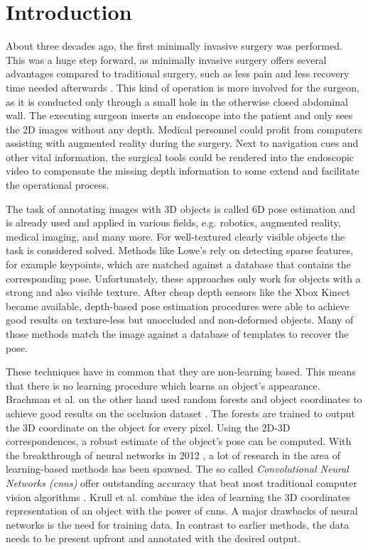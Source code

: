 \chapter{Introduction}

About three decades ago, the first minimally invasive surgery was performed. This was a huge step forward, as minimally invasive surgery offers several advantages compared to traditional surgery, such as less pain and less recovery time needed afterwards \cite{minimallyinvasive}. This kind of operation is more involved for the surgeon, as it is conducted only through a small hole in the otherwise closed abdominal wall. The executing surgeon inserts an endoscope into the patient and only sees the 2D images without any depth. Medical personnel could profit from computers assisting with augmented reality during the surgery. Next to navigation cues and other vital information, the surgical tools could be rendered into the  endoscopic video to compensate the missing depth information to some extend and facilitate the operational process. \

The task of annotating images with 3D objects is called 6D pose estimation and is already used and applied in various fields, e.g. robotics, augmented reality, medical imaging, and many more. For well-textured clearly visible objects the task is considered solved. Methods like Lowe's \cite{dglowe1} rely on detecting sparse features, for example keypoints, which are matched against a database that contains the corresponding pose.
Unfortunately, these approaches only work for objects with a strong and also visible texture. After cheap depth sensors like the Xbox Kinect became available, depth-based pose estimation procedures were able to achieve good results on texture-less but unoccluded and non-deformed objects. Many of those methods match the image against a database of templates to recover the pose. \

These techniques have in common that they are non-learning based. This means that there is no learning procedure which learns an object's appearance. Brachman et al. on the other hand used random forests and object coordinates to achieve good results on the occlusion dataset \cite{brachmann1}. The forests are trained to output the 3D coordinate on the object for every pixel. Using the 2D-3D correspondences, a robust estimate of the object's pose can be computed. With the breakthrough of neural networks in 2012 \cite{imagenet}, a lot of research in the area of learning-based methods has been spawned. The so called \textit{Convolutional Neural Networks (\gls{cnn}s)} offer outstanding accuracy that beat most traditional computer vision algorithms \cite{ylecun}. Krull et al. \cite{akrull} combine the idea of learning the 3D coordinates representation of an object with the power of \gls{cnn}s. A major drawbacks of neural networks is the need for training data. In contrast to earlier methods, the data needs to be present upfront and annotated with the desired output. \

